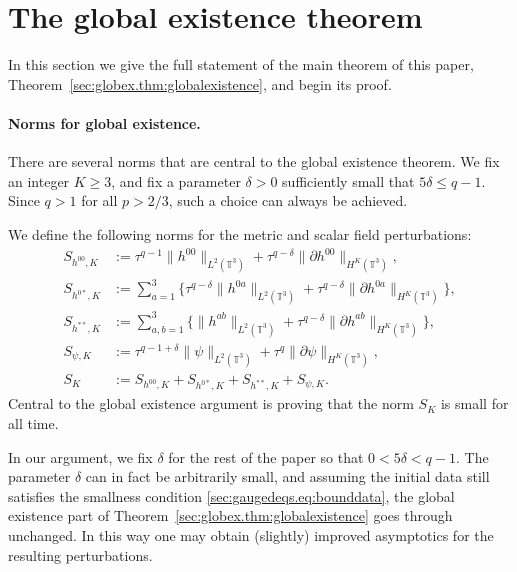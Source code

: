 \documentclass{article}
\newcommand{\TT}{\mathbb{T}}
\newcommand{\pa}{\partial}
\begin{document}
\section{The global existence theorem}\label{sec:globex}
In this section we give the full statement of the main theorem of this paper, Theorem~\ref{sec:globex.thm:globalexistence}, and begin its proof.

\paragraph{Norms for global existence.}
There are several norms that are central to the global existence theorem. We fix an integer $K \geq 3$, and fix a parameter $\delta > 0$ sufficiently small that $5\delta \leq q - 1$. Since $q > 1$ for all $p > 2/3$, such a choice can always be achieved.

We define the following norms for the metric and scalar field perturbations:
\begin{subequations}
    \begin{align}
        S_{h^{00},K} &:= \tau^{q-1}\| h^{00}\|_{L^2(\TT^3)} + \tau^{q-\delta}\|\pa  h^{00}\|_{H^K(\TT^3)},\\
        S_{h^{0*},K} &:= \sum_{a=1}^3\Big\{\tau^{q-\delta}\| h^{0a}\|_{L^2(\TT^3)} + \tau^{q-\delta}\|\pa  h^{0a}\|_{H^K(\TT^3)}\Big\},\\
        S_{h^{**},K} &:= \sum_{a,b=1}^3\Big\{\| h^{ab}\|_{L^2(\TT^3)} + \tau^{q-\delta}\|\pa  h^{ab}\|_{H^K(\TT^3)}\Big\},\\
        S_{\psi,K} &:=\tau^{q-1+\delta}\|\psi\|_{L^2(\TT^3)} + \tau^q\|\pa\psi\|_{H^K(\TT^3)},\\
        S_K &:= S_{h^{00},K} + S_{h^{0*},K} + S_{h^{**},K} +S_{\psi,K}.
    \end{align}
\end{subequations}
Central to the global existence argument is proving that the norm $S_K$ is small for all time.
\begin{remark}
    In our argument, we fix $\delta$ for the rest of the paper so that $0 < 5\delta < q-1$. The parameter $\delta$ can in fact be arbitrarily small, and assuming the initial data still satisfies the smallness condition \eqref{sec:gaugedeqs.eq:bounddata}, the global existence part of Theorem~\ref{sec:globex.thm:globalexistence} goes through unchanged. In this way one may obtain (slightly) improved asymptotics for the resulting perturbations.
\end{remark}
\end{document}
